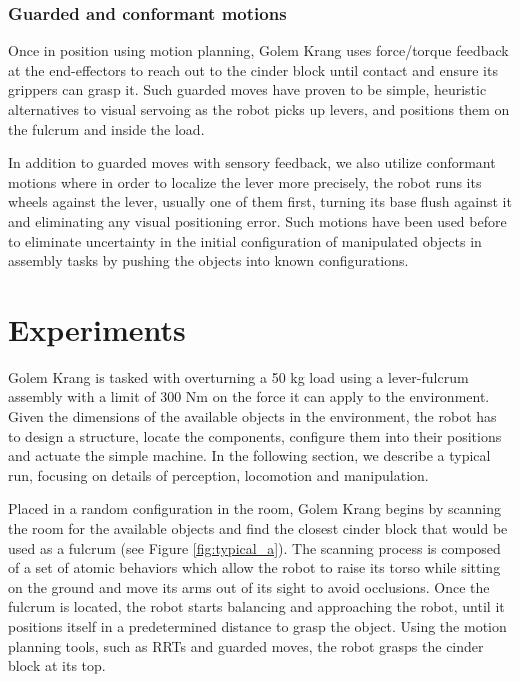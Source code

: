 \documentclass[runningheads,a4paper]{llncs}
\begin{document}
\vspace{-2em}
\subsubsection{Guarded and conformant motions}

Once in position using motion planning, Golem Krang uses force/torque feedback at the end-effectors
to reach out to the cinder block until contact and ensure its grippers can grasp it. Such guarded
moves have proven to be simple, heuristic alternatives to visual servoing as the robot picks up
levers, and positions them on the fulcrum and inside the load.

In addition to guarded moves with sensory feedback, we also utilize conformant motions where
in order to localize the lever more precisely, the robot runs its wheels against the lever,
usually one of them first, turning its base flush against it and eliminating any visual positioning error.
Such motions have been used before to eliminate uncertainty in the initial configuration of manipulated
objects in assembly tasks by pushing the objects into known configurations. \cite{mason1986mechanics}

\section{Experiments}

Golem Krang is tasked with overturning a 50 kg load using a lever-fulcrum assembly with a limit of
300 Nm on the force it can apply to the environment. Given the dimensions of the 
available objects in the environment, the robot has to design a structure, locate the components,
configure them into their positions and actuate the simple machine. In the following section, we
describe a typical run, focusing on details of perception, locomotion and manipulation.

Placed in a random configuration in the room, Golem Krang begins by scanning the room for the 
available objects and find the closest cinder block that would be used as a fulcrum (see Figure \ref{fig:typical_a}).
The scanning process is composed of a set of atomic behaviors which allow the robot to raise
its torso while sitting on the ground and move its arms out of its sight to avoid occlusions.
Once the fulcrum is located, the robot starts balancing and approaching the robot, until it 
positions itself in a predetermined distance to grasp the object. Using the motion planning tools,
such as RRTs and guarded moves, the robot grasps the cinder block at its top.
\end{document}
